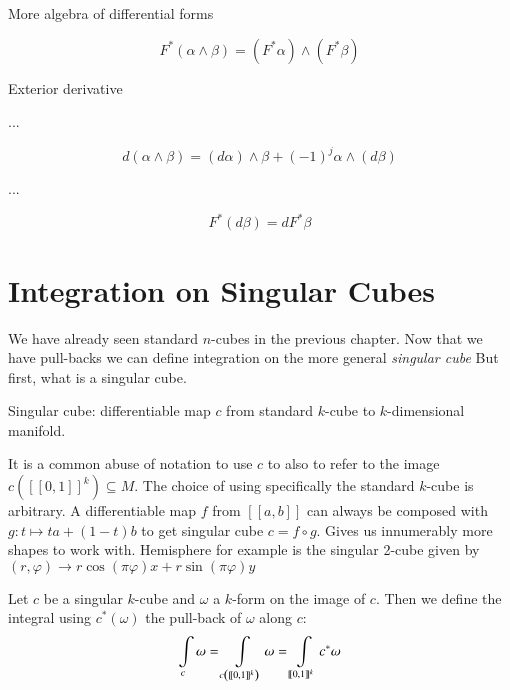 More algebra of differential forms

\begin{equation}
F^* (\alpha \wedge \beta ) = (F^* \alpha) \wedge (F^* \beta)
\end{equation}

\begin{definition}
Exterior derivative
\end{definition}

...

\begin{equation}
d(\alpha \wedge \beta) = (d \alpha) \wedge \beta + (-1)^j \alpha \wedge ( d \beta)
\end{equation}

...

\begin{equation}
F^* (d \beta ) = dF^* \beta
\end{equation}




%
%
\section{Integration on Singular Cubes}


We have already seen standard $n$-cubes in the previous chapter.
Now that we have pull-backs we can define integration on the more general \emph{singular cube}
But first, what is a singular cube.


\begin{definition}
	Singular cube: differentiable map $c$ from standard $k$-cube to $k$-dimensional manifold.
\end{definition}

It is a common abuse of notation to use $c$ to also to refer to the image $c( [\![ 0,1]\!]^k ) \subseteq M$.
The choice of using specifically the standard $k$-cube is arbitrary.
A differentiable map $f$ from $[\![a,b]\!]$ can always be composed with $g:t \mapsto ta +(1-t)b$ 
to get singular cube $c=f \circ g$.
Gives us innumerably more shapes to work with.
Hemisphere for example is the singular 2-cube given by $(r, \varphi) \to r \cos(\pi \varphi) x+ r \sin(\pi \varphi) y$


\begin{definition}
	Let $c$ be a singular $k$-cube and $\omega$ a $k$-form on the image of $c$.
	Then we define the integral using $c^*(\omega)$ the pull-back of $\omega$ along $c$:
	\begin{equation}
		\int\displaylimits_c \omega 
		= \int\displaylimits_{c \left( [\![0,1]\!]^k \right)} \omega
		= \int\displaylimits_{[\![0,1]\!]^k} c^* \omega
	\end{equation}
\end{definition}



